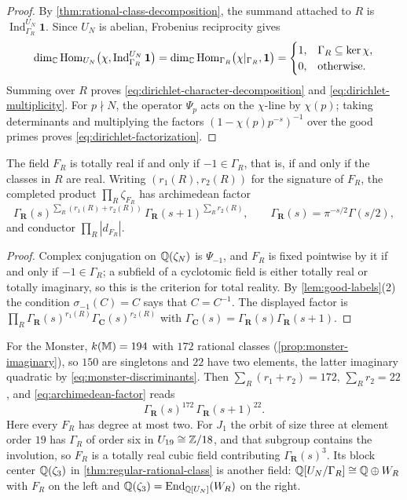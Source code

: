 \begin{proof}
By \cref{thm:rational-class-decomposition}, the summand attached to \(R\)
is \(\operatorname{Ind}_{\Gamma_R}^{U_N}\mathbf1\).  Since \(U_N\) is
abelian, Frobenius reciprocity gives
\[
 \dim_\mathbb C\operatorname{Hom}_{U_N}
 \bigl(\chi,\operatorname{Ind}_{\Gamma_R}^{U_N}\mathbf1\bigr)
 =
 \dim_\mathbb C\operatorname{Hom}_{\Gamma_R}
 \bigl(\chi|_{\Gamma_R},\mathbf1\bigr)
 =
 \begin{cases}
 1,&\Gamma_R\subseteq\ker\chi,\\
 0,&\text{otherwise}.
 \end{cases}
\]
Summing over \(R\) proves
\eqref{eq:dirichlet-character-decomposition} and
\eqref{eq:dirichlet-multiplicity}.  For \(p\nmid N\), the operator
\(\Psi_p\) acts on the \(\chi\)-line by \(\chi(p)\); taking determinants
and multiplying the factors \((1-\chi(p)p^{-s})^{-1}\) over the good
primes proves \eqref{eq:dirichlet-factorization}.
\end{proof}

\begin{corollary}
\label{cor:archimedean-factor}
The field \(F_R\) is totally real if and only if \(-1\in\Gamma_R\), that is,
if and only if the classes in \(R\) are real.  Writing \((r_1(R),r_2(R))\) for
the signature of \(F_R\), the completed product
\(\prod_R\zeta_{F_R}\) has archimedean factor
\begin{equation}
 \Gamma_{\mathbf R}(s)^{\sum_R(r_1(R)+r_2(R))}\,
 \Gamma_{\mathbf R}(s+1)^{\sum_Rr_2(R)},
 \qquad
 \Gamma_{\mathbf R}(s)=\pi^{-s/2}\Gamma(s/2),
 \label{eq:archimedean-factor}
\end{equation}
and conductor \(\prod_R|d_{F_R}|\).
\end{corollary}

\begin{proof}
Complex conjugation on \(\mathbb Q(\zeta_N)\) is \(\Psi_{-1}\), and \(F_R\) is fixed
pointwise by it if and only if \(-1\in\Gamma_R\); a subfield of a cyclotomic
field is either totally real or totally imaginary, so this is the criterion
for total reality.  By \cref{lem:good-labels}(2) the condition
\(\sigma_{-1}(C)=C\) says that \(C=C^{-1}\).  The displayed factor is
\(\prod_R\Gamma_{\mathbf R}(s)^{r_1(R)}\Gamma_{\mathbf C}(s)^{r_2(R)}\) with
\(\Gamma_{\mathbf C}(s)=\Gamma_{\mathbf R}(s)\Gamma_{\mathbf R}(s+1)\).
\end{proof}

For the Monster, \(k(\mathbb M)=194\) with \(172\) rational classes
(\cref{prop:monster-imaginary}), so \(150\) are singletons and \(22\) have two
elements, the latter imaginary quadratic by
\eqref{eq:monster-discriminants}.  Then \(\sum_R(r_1+r_2)=172\),
\(\sum_Rr_2=22\), and \eqref{eq:archimedean-factor} reads
\[
 \Gamma_{\mathbf R}(s)^{172}\,\Gamma_{\mathbf R}(s+1)^{22}.
\]
Here every \(F_R\) has degree at most two.  For \(J_1\) the orbit of size
three at element order \(19\) has \(\Gamma_R\) of order six in
\(U_{19}\cong\mathbb Z/18\), and that subgroup contains the involution, so \(F_R\) is
a totally real cubic field contributing \(\Gamma_{\mathbf R}(s)^3\).  Its
block center \(\mathbb Q(\zeta_3)\) in \cref{thm:regular-rational-class} is another
field: \(\mathbb Q[U_N/\Gamma_R]\cong\mathbb Q\oplus W_R\) with \(F_R\) on the left and
\(\mathbb Q(\zeta_3)=\operatorname{End}_{\mathbb Q[U_N]}(W_R)\) on the right.

